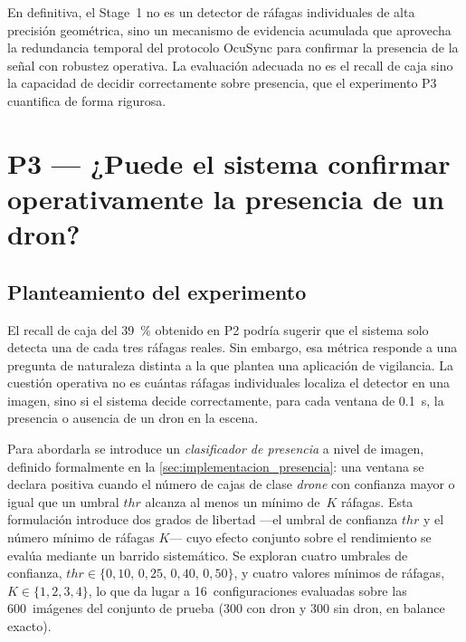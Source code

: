 En definitiva, el Stage~1 no es un detector de ráfagas individuales de alta precisión geométrica, sino un mecanismo de evidencia acumulada que aprovecha la redundancia temporal del protocolo OcuSync para confirmar la presencia de la señal con robustez operativa. La evaluación adecuada no es el recall de caja sino la capacidad de decidir correctamente sobre presencia, que el experimento P3 cuantifica de forma rigurosa.

\section{P3 --- ¿Puede el sistema confirmar operativamente la presencia de un dron?}
\label{sec:bloque_presencia}

\subsection{Planteamiento del experimento}
\label{sec:p3_planteamiento}

El recall de caja del \SI{39}{\percent} obtenido en P2 podría sugerir que el sistema solo detecta una de cada tres ráfagas reales. Sin embargo, esa métrica responde a una pregunta de naturaleza distinta a la que plantea una aplicación de vigilancia. La cuestión operativa no es cuántas ráfagas individuales localiza el detector en una imagen, sino si el sistema decide correctamente, para cada ventana de \SI{0.1}{\second}, la presencia o ausencia de un dron en la escena.


Para abordarla se introduce un \emph{clasificador de presencia} a nivel de imagen, definido formalmente en la \cref{sec:implementacion_presencia}: una ventana se declara positiva cuando el número de cajas de clase \emph{drone} con confianza mayor o igual que un umbral $\mathit{thr}$ alcanza al menos un mínimo de~$K$ ráfagas. Esta formulación introduce dos grados de libertad ---el umbral de confianza $\mathit{thr}$ y el número mínimo de ráfagas $K$--- cuyo efecto conjunto sobre el rendimiento se evalúa mediante un barrido sistemático. Se exploran cuatro umbrales de confianza, $\mathit{thr} \in \{0{,}10,\, 0{,}25,\, 0{,}40,\, 0{,}50\}$, y cuatro valores mínimos de ráfagas, $K \in \{1, 2, 3, 4\}$, lo que da lugar a \num{16}~configuraciones evaluadas sobre las \num{600}~imágenes del conjunto de prueba (\num{300} con dron y \num{300} sin dron, en balance exacto).

